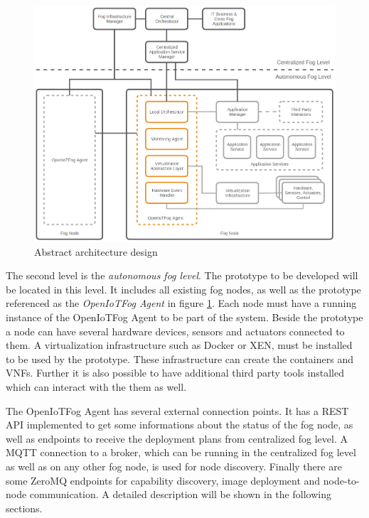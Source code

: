 \begin{figure}[H]
    \centering
    \includegraphics[width=\textwidth]{resources/images/initial_structure.png}
    \caption[Abstract architecture design]{Abstract architecture design}
    \label{fig:abstract_architecture_design}
\end{figure}

The second level is the \textit{autonomous fog level}.
The prototype to be developed will be located in this level.
It includes all existing fog nodes, as well as the prototype referenced as the \textit{OpenIoTFog Agent} in figure \ref{fig:abstract_architecture_design}.
Each node must have a running instance of the OpenIoTFog Agent to be part of the system.
Beside the prototype a node can have several hardware devices, sensors and actuators connected to them.
A virtualization infrastructure such as Docker or XEN, must be installed to be used by the prototype.
These infrastructure can create the containers and \acp{VNF}.
Further it is also possible to have additional third party tools installed which can interact with the them as well.

The OpenIoTFog Agent has several external connection points.
It has a \ac{REST} \ac{API} implemented to get some informations about the status of the fog node, as well as endpoints to receive the deployment plans from centralized fog level.
A \ac{MQTT} connection to a broker, which can be running in the centralized fog level as well as on any other fog node, is used for node discovery.
Finally there are some ZeroMQ endpoints for capability discovery, image deployment and node-to-node communication.
A detailed description will be shown in the following sections.

